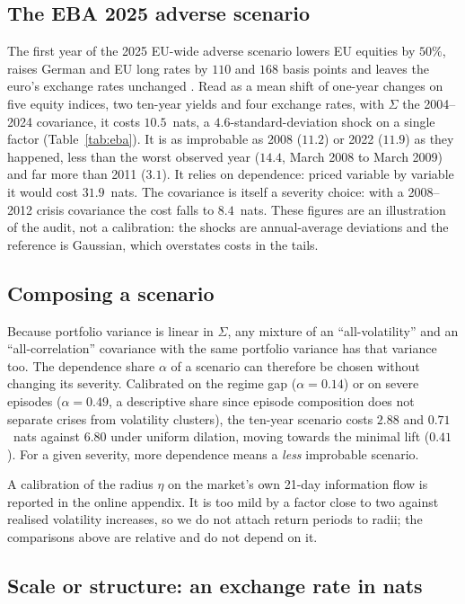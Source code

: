 \documentclass[12pt]{article}
\theoremstyle{definition}
\theoremstyle{remark}
\begin{document}
\begin{doublespace}
\subsection{The EBA 2025 adverse scenario}

The first year of the 2025 EU-wide adverse scenario lowers EU equities by
$50\%$, raises German and EU long rates by $110$ and $168$ basis points and
leaves the euro's exchange rates unchanged \citep{eba2025}. Read as a mean
shift of one-year changes on five equity indices, two ten-year yields and four
exchange rates, with $\Sigma$ the 2004--2024 covariance, it costs
$10.5$~nats, a $4.6$-standard-deviation shock on a single factor
(Table~\ref{tab:eba}). It is as improbable as 2008 ($11.2$) or 2022 ($11.9$)
as they happened, less than the worst observed year ($14.4$, March 2008 to
March 2009) and far more than 2011 ($3.1$). It relies on dependence: priced
variable by variable it would cost $31.9$~nats. The covariance is itself a
severity choice: with a 2008--2012 crisis covariance the cost falls to
$8.4$~nats. These figures are an illustration of the audit, not a
calibration: the shocks are annual-average deviations and the reference is
Gaussian, which overstates costs in the tails.

\subsection{Composing a scenario}

Because portfolio variance is linear in $\Sigma$, any mixture of an
``all-volatility'' and an ``all-correlation'' covariance with the same
portfolio variance has that variance too. The dependence share $\alpha$ of a
scenario can therefore be chosen without changing its severity. Calibrated on
the regime gap ($\alpha=0.14$) or on severe episodes ($\alpha=0.49$, a
descriptive share since episode composition does not separate crises from
volatility clusters), the
ten-year scenario costs $2.88$ and $0.71$~nats against $6.80$ under uniform
dilation, moving towards the minimal lift ($0.41$). For a given severity,
more dependence means a \emph{less} improbable scenario.

A calibration of the radius $\eta$ on the market's own 21-day information flow
is reported in the online appendix. It is too mild by a factor close to two
against realised volatility increases, so we do not attach return periods to
radii; the comparisons above are relative and do not depend on it.

\subsection{Scale or structure: an exchange rate in nats}


\end{doublespace}
\end{document}
